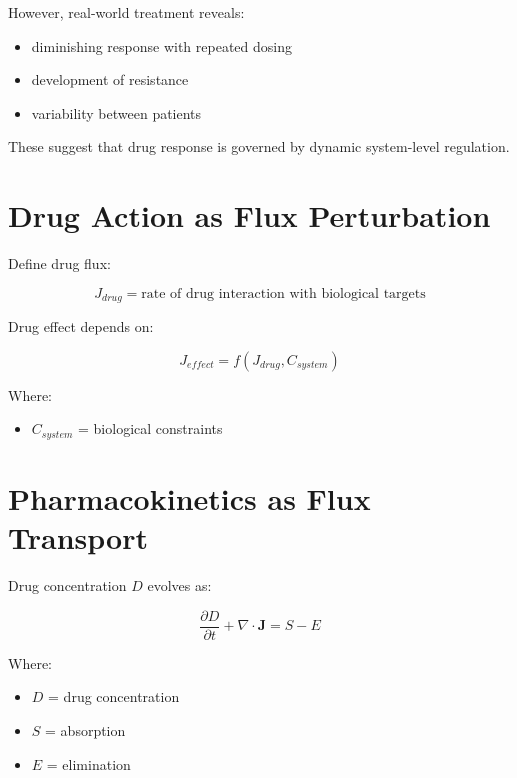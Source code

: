 \documentclass[11pt]{article}
\begin{document}
However, real-world treatment reveals:

\begin{itemize}
    \item diminishing response with repeated dosing
    \item development of resistance
    \item variability between patients
\end{itemize}

These suggest that drug response is governed by dynamic system-level regulation.

\section{Drug Action as Flux Perturbation}

Define drug flux:

\begin{equation}
J_{drug} = \text{rate of drug interaction with biological targets}
\end{equation}

Drug effect depends on:

\begin{equation}
J_{effect} = f(J_{drug}, C_{system})
\end{equation}

Where:

\begin{itemize}
    \item $C_{system}$ = biological constraints
\end{itemize}

\section{Pharmacokinetics as Flux Transport}

Drug concentration $D$ evolves as:

\begin{equation}
\frac{\partial D}{\partial t} + \nabla \cdot \mathbf{J} = S - E
\end{equation}

Where:

\begin{itemize}
    \item $D$ = drug concentration
    \item $S$ = absorption
    \item $E$ = elimination
\end{itemize}
\end{document}
